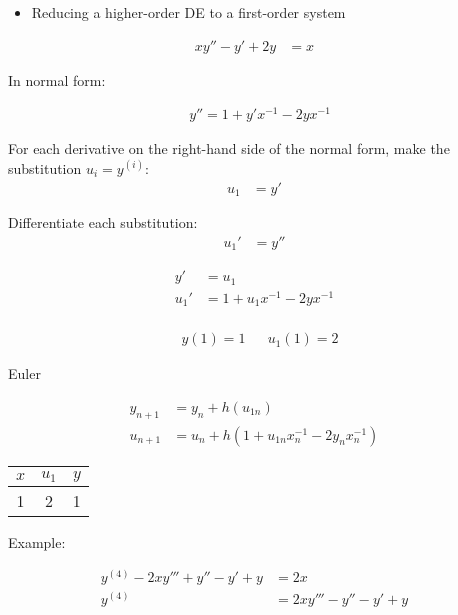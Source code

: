		\begin{itemize}
			\item{Reducing a higher-order DE to a first-order system}
		\end{itemize}

		\begin{align}
			xy'' - y' + 2y &= x&
		\end{align}

		In normal form:

		\begin{align}
			y'' = 1 + y'x^{-1} -2yx^{-1}
		\end{align}

		For each derivative on the right-hand side of the normal form, make the substitution $u_{i} = y^{(i)}$:
		\begin{align}
			u_{1} &= y'&
		\end{align}

		Differentiate each substitution:
		\begin{align}
			u_{1}' &= y''&
		\end{align}

		\begin{align}
			y' &= u_{1}& \\
			u_{1}' &= 1 + u_{1}x^{-1} - 2yx^{-1}& \\
		\end{align}

		\begin{align}
			&y(1) = 1&
			&u_{1}(1) = 2&
		\end{align}

		Euler

		\begin{align}
			y_{n+1} &= y_{n} + h(u_{1n})& \\
			u_{n+1} &= u_{n} + h(1 + u_{1n}x_{n}^{-1}-2y_{n}x_{n}^{-1})&
		\end{align}

		\begin{table}[H]
			\begin{tabular}{|c|c|c|}
				\hline
				$x$ & $u_{1}$ & $y$ \\ \hline
				1 & 2 & 1 \hline
			\end{tabular}
		\end{table}

		Example:

		\begin{align}
			y^{(4)} - 2xy''' + y'' - y' + y &= 2x& \\
			y^{(4)} &= 2xy''' - y'' - y' + y&
		\end{align}

